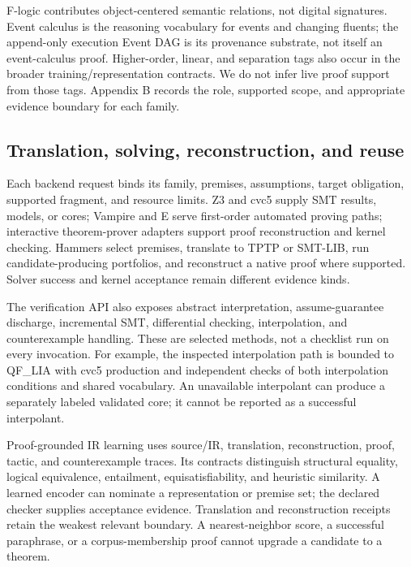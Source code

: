 \documentclass{article}
\begin{document}
F-logic contributes object-centered semantic relations, not digital signatures. Event calculus is the reasoning vocabulary for events and changing fluents; the append-only execution Event DAG is its provenance substrate, not itself an event-calculus proof. Higher-order, linear, and separation tags also occur in the broader training/representation contracts. We do not infer live proof support from those tags. Appendix B records the role, supported scope, and appropriate evidence boundary for each family.

\subsection{Translation, solving, reconstruction, and reuse}

Each backend request binds its family, premises, assumptions, target obligation, supported fragment, and resource limits. Z3 and cvc5 supply SMT results, models, or cores; Vampire and E serve first-order automated proving paths; interactive theorem-prover adapters support proof reconstruction and kernel checking. Hammers select premises, translate to TPTP or SMT-LIB, run candidate-producing portfolios, and reconstruct a native proof where supported. Solver success and kernel acceptance remain different evidence kinds.

The verification API also exposes abstract interpretation, assume-guarantee discharge, incremental SMT, differential checking, interpolation, and counterexample handling. These are selected methods, not a checklist run on every invocation. For example, the inspected interpolation path is bounded to QF\_\allowbreak{}LIA with cvc5 production and independent checks of both interpolation conditions and shared vocabulary. An unavailable interpolant can produce a separately labeled validated core; it cannot be reported as a successful interpolant.

Proof-grounded IR learning uses source/IR, translation, reconstruction, proof, tactic, and counterexample traces. Its contracts distinguish structural equality, logical equivalence, entailment, equisatisfiability, and heuristic similarity. A learned encoder can nominate a representation or premise set; the declared checker supplies acceptance evidence. Translation and reconstruction receipts retain the weakest relevant boundary. A nearest-neighbor score, a successful paraphrase, or a corpus-membership proof cannot upgrade a candidate to a theorem.
\end{document}
